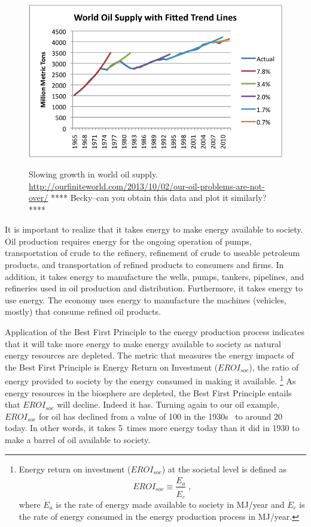 \begin{figure}[!ht]
\centering\
\includegraphics[width=\linewidth]{Part_0/Chapter_Introduction/images/growth-in-world-oil-supply.png}
\caption[World Oil Supply]{Slowing growth in world oil supply.
\url{http://ourfiniteworld.com/2013/10/02/our-oil-problems-are-not-over/}
**** Becky--can you obtain this data and plot it similarly? ****
}
\label{fig:oil_production}
\end{figure}

It is important to realize that it takes energy to make energy available to society.
Oil production requires energy for the ongoing
operation of pumps, 
transportation of crude to the refinery,
refinement of crude to useable petroleum products, and 
transportation of refined products to consumers and firms.
In addition, it takes energy to manufacture the wells, pumps, 
tankers, pipelines, and
refineries used in oil production and distribution.
Furthermore, it takes energy to use energy. 
The economy uses energy to manufacture the machines (vehicles, mostly)
that consume refined oil products.

Application of the Best First Principle to the energy production process 
indicates that it will take more energy 
to make energy available to society as natural energy resources are depleted.
The metric that measures the energy impacts of the Best First Principle is 
Energy Return on Investment ($EROI_{soc}$), 
the ratio of energy provided to society 
by the energy consumed in making it available.%
	\footnote{
	Energy return on investment ($EROI_{soc}$) at the societal level is defined as 
	\begin{equation}
		EROI_{soc} \equiv \frac{\dot{E}_a}{\dot{E}_c} \; ,
	\end{equation}
	where $\dot{E}_a$ is the rate of energy made available to society in MJ/year
	and $\dot{E}_c$ is the rate of energy consumed in the energy production process in MJ/year.
	}
As energy resources in the biosphere are depleted, 
the Best First Principle entails that
$EROI_{soc}$ will decline.
Indeed it has.
Turning again to our oil example, $EROI_{soc}$ for oil has declined 
from a value of 100 in the 1930s~\cite[p.~781]{Cleveland:2005uy} 
to around 20 today.\cite[Fig.~2]{Hall:2014aa}
In other words, it takes 5~times more energy today
than it did in 1930
to make a barrel of oil available to society.


